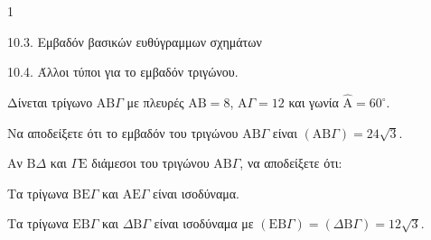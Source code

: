 \begin{ylh}{1}
    \item 10.3. Εμβαδόν βασικών ευθύγραμμων σχημάτων
    \item 10.4. Άλλοι τύποι για το εμβαδόν τριγώνου.
\end{ylh}
\begin{figure} %
    \centering
\end{figure}
Δίνεται τρίγωνο $\text{AB}\Gamma$ με πλευρές $\text{AB}=8$, $\text{A}\Gamma=12$ και γωνία $\hat{\text{A}} = 60^\circ$.
\begin{alist}
    \item Να αποδείξετε ότι το εμβαδόν του τριγώνου $\text{AB}\Gamma$ είναι $(\text{AB}\Gamma)=24\sqrt{3}$. 
    \item Αν $\text{B}\Delta$ και $\Gamma\text{E}$ διάμεσοι του τριγώνου $\text{AB}\Gamma$, να αποδείξετε ότι:
    \begin{rlist}
        \item Τα τρίγωνα $\text{B}\text{E}\Gamma$ και $\text{A}\text{E}\Gamma$ είναι ισοδύναμα. 
        \item Τα τρίγωνα $\text{E}\text{B}\Gamma$ και $\Delta\text{B}\Gamma$ είναι ισοδύναμα με $(\text{E}\text{B}\Gamma)=(\Delta\text{B}\Gamma)=12\sqrt{3}$. 
    \end{rlist}
\end{alist}